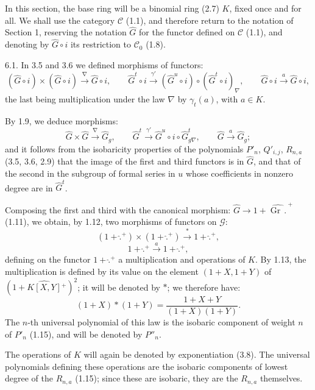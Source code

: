 In this section, the base ring will be a binomial ring (2.7) \(K\), fixed once and for all. We shall use the category \(\mathcal C\) (1.1), and therefore return to the notation of Section 1, reserving the notation \(\widehat G\) for the functor defined on \(\mathcal C\) (1.1), and denoting by \(\widehat G\circ i\) its restriction to \(\mathcal C_0\) (1.8).

6.1. In 3.5 and 3.6 we defined morphisms of functors:
\[
  (\widehat G\circ i)\times(\widehat G\circ i)\xrightarrow{\nabla}\widehat G\circ i,
  \qquad
  \widehat G^t\circ i\xrightarrow{\gamma'}(\widehat G^u\circ i)\circ(\widehat G^t\circ i)_\nabla,
  \qquad
  \widehat G\circ i\xrightarrow{a}\widehat G\circ i,
\]
the last being multiplication under the law \(\nabla\) by \(\gamma_t(a)\), with \(a\in K\).

By 1.9, we deduce morphisms:
\[
  \widehat G\times\widehat G\xrightarrow{\nabla}\widehat G_g,
  \qquad
  \widehat G^t\xrightarrow{\gamma'}\widehat G^u\circ i\circ\widehat G^t_{g\nabla},
  \qquad
  \widehat G\xrightarrow{a}\widehat G_g;
\]
and it follows from the isobaricity properties of the polynomials \(P'_n\), \(Q'_{i,j}\), \(R_{n,a}\) (3.5, 3.6, 2.9) that the image of the first and third functors is in \(\widehat G\), and that of the second in the subgroup of formal series in \(u\) whose coefficients in nonzero degree are in \(\widehat G^t\).

Composing the first and third with the canonical morphism: \(\widehat G\longrightarrow 1+\widehat{\operatorname{Gr}\,\mathord{.}\,}^{+}\) (1.11), we obtain, by 1.12, two morphisms of functors on \(\mathcal G\):
%
\[
  (1+\widehat{\mathord{.}}{}^{+})\times(1+\widehat{\mathord{.}}{}^{+})\xrightarrow{\ \ast\ }1+\widehat{\mathord{.}}{}^{+},
\]
\[
  1+\widehat{\mathord{.}}{}^{+}\xrightarrow{\ a\ }1+\widehat{\mathord{.}}{}^{+},
\]
defining on the functor \(1+\widehat{\mathord{.}}{}^{+}\) a multiplication and operations of \(K\). By 1.13, the multiplication is defined by its value on the element \((1+X,1+Y)\) of \((1+\widehat{K[X,Y]}{}^{+})^{2}\); it will be denoted by \(\ast\); we therefore have:
\begin{equation}\tag{6.1.1}
  (1+X)\ast(1+Y)=\frac{1+X+Y}{(1+X)(1+Y)}.
\end{equation}
The \(n\)-th universal polynomial of this law is the isobaric component of weight \(n\) of \(P'_n\) (1.15), and will be denoted by \(P''_n\).

The operations of \(K\) will again be denoted by exponentiation (3.8). The universal polynomials defining these operations are the isobaric components of lowest degree of the \(R_{n,a}\) (1.15); since these are isobaric, they are the \(R_{n,a}\) themselves.

